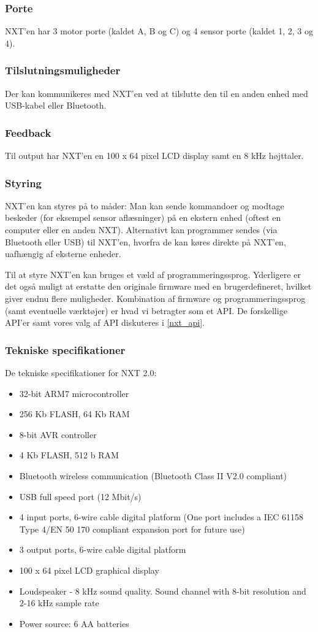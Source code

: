 \subsubsection{Porte}
NXT'en har 3 motor porte (kaldet A, B og C) og 4 sensor porte (kaldet 1, 2, 3 og 4).

\subsubsection{Tilslutningsmuligheder}
Der kan kommunikeres med NXT'en ved at tilslutte den til en anden enhed med USB-kabel eller Bluetooth\textregistered.

\subsubsection{Feedback}
Til output har NXT'en en 100 x 64 pixel LCD display samt en 8 kHz højttaler.

\subsubsection{Styring}
NXT'en kan styres på to måder:
Man kan sende kommandoer og modtage beskeder (for eksempel sensor aflæsninger) på en ekstern enhed (oftest en computer eller en anden NXT).
Alternativt kan programmer sendes (via Bluetooth eller USB) til NXT'en, hvorfra de kan køres direkte på NXT'en, uafhængig af eksterne enheder.

Til at styre NXT'en kan bruges et væld af programmeringssprog.
Yderligere er det også muligt at erstatte den originale firmware med en brugerdefineret, hvilket giver endnu flere muligheder.
Kombination af firmware og programmeringssprog (samt eventuelle værktøjer) er hvad vi betragter som et API.
De forskellige API'er samt vores valg af API diskuteres i \cref{nxt_api}.

\subsubsection{Tekniske specifikationer}
De tekniske specifikationer for NXT 2.0:\cite{nxt}
\begin{itemize}
\item{32-bit ARM7 microcontroller}
\item{256 Kb FLASH, 64 Kb RAM}
\item{8-bit AVR controller}
\item{4 Kb FLASH, 512 b RAM}
\item{Bluetooth wireless communication (Bluetooth Class II V2.0 compliant)}
\item{USB full speed port (12 Mbit/s)}
\item{4 input ports, 6-wire cable digital platform (One port includes a IEC 61158 Type 4/EN 50 170 compliant expansion port for future use)}
\item{3 output ports, 6-wire cable digital platform}
\item{100 x 64 pixel LCD graphical display}
\item{Loudspeaker - 8 kHz sound quality. Sound channel with 8-bit resolution and 2-16 kHz sample rate}
\item{Power source: 6 AA batteries}
\end{itemize}

